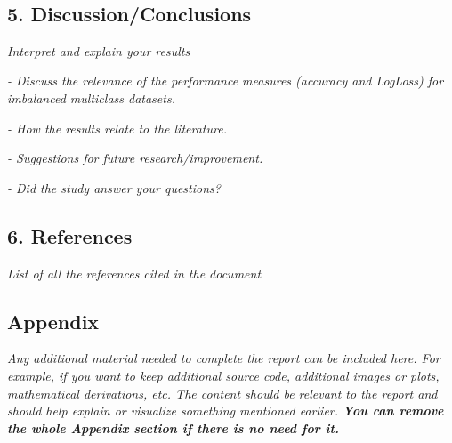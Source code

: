 \documentclass[11pt]{article}
\begin{document}
    \begin{center}
    \end{center}
    { \hspace*{\fill} \\}
    
    \hypertarget{discussionconclusions}{%
\subsection{5. Discussion/Conclusions}\label{discussionconclusions}}

    \emph{Interpret and explain your results }

\emph{- Discuss the relevance of the performance measures (accuracy and
LogLoss) for imbalanced multiclass datasets. }

\emph{- How the results relate to the literature. }

\emph{- Suggestions for future research/improvement. }

\emph{- Did the study answer your questions? }

    \hypertarget{references}{%
\subsection{6. References}\label{references}}

    \emph{List of all the references cited in the document}

    \hypertarget{appendix}{%
\subsection{Appendix}\label{appendix}}

\emph{Any additional material needed to complete the report can be
included here. For example, if you want to keep additional source code,
additional images or plots, mathematical derivations, etc. The content
should be relevant to the report and should help explain or visualize
something mentioned earlier. \textbf{You can remove the whole Appendix
section if there is no need for it.} }
\end{document}

